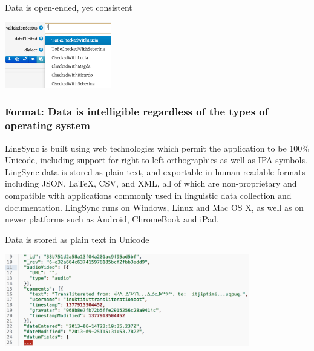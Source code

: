 \documentclass[letterpaper, 12pt, dvips]{mitwpl}
\begin{document}
\begin{exe} 
\ex Data is open-ended, yet consistent

 \centering
    \includegraphics[width=0.35\textwidth]{typeaheadForPreviousCategories}

\label{ex:consistent}
\end{exe}

\subsubsection{\textbf{Format}: Data is intelligible regardless of the types of operating system}
 
LingSync is built using web technologies which permit the application to be 100\% Unicode, including support for right-to-left orthographies as well as IPA symbols. LingSync data is stored as plain text, and exportable in human-readable formats including JSON, LaTeX, CSV, and XML, all of which are non-proprietary and compatible with applications commonly used in linguistic data collection and documentation. LingSync runs on Windows, Linux and Mac OS X, as well as on newer platforms such as Android, ChromeBook and iPad.

\begin{exe} 
\ex Data is stored as plain text in Unicode

 \centering
    \includegraphics[width=0.8\textwidth]{dataIsPlainTextUnicode}

\label{ex:intelligible}
\end{exe}
\end{document}
